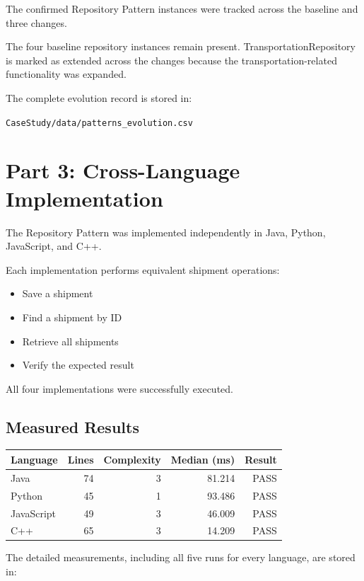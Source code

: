 \documentclass[12pt,a4paper]{article}
\begin{document}
The confirmed Repository Pattern instances were tracked across the baseline and three changes.

The four baseline repository instances remain present. TransportationRepository is marked as extended across the changes because the transportation-related functionality was expanded.

The complete evolution record is stored in:

\texttt{CaseStudy/data/patterns\_evolution.csv}

\section{Part 3: Cross-Language Implementation}

The Repository Pattern was implemented independently in Java, Python, JavaScript, and C++.

Each implementation performs equivalent shipment operations:

\begin{itemize}
    \item Save a shipment
    \item Find a shipment by ID
    \item Retrieve all shipments
    \item Verify the expected result
\end{itemize}

All four implementations were successfully executed.

\subsection{Measured Results}

\begin{center}
\begin{tabular}{lrrrr}
\toprule
Language & Lines & Complexity & Median (ms) & Result \\
\midrule
Java & 74 & 3 & 81.214 & PASS \\
Python & 45 & 1 & 93.486 & PASS \\
JavaScript & 49 & 3 & 46.009 & PASS \\
C++ & 65 & 3 & 14.209 & PASS \\
\bottomrule
\end{tabular}
\end{center}

The detailed measurements, including all five runs for every language, are stored in:
\end{document}
